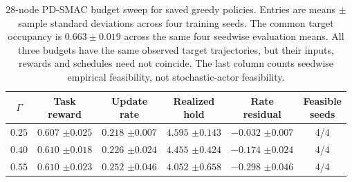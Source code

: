 \begin{table}[htbp]
\caption{28-node PD-SMAC budget sweep for saved greedy policies. Entries are means $\pm$ sample standard deviations across four training seeds. The common target occupancy is $0.663\pm0.019$ across the same four seedwise evaluation means. All three budgets have the same observed target trajectories, but their inputs, rewards and schedules need not coincide. The last column counts seedwise empirical feasibility, not stochastic-actor feasibility.}
\label{comp:tab:melanoma28_budget_sweep}
\centering
\begingroup
\fontsize{8}{10}\selectfont
\setlength{\tabcolsep}{2pt}
\renewcommand{\arraystretch}{1.14}
\begin{tabular*}{\linewidth}{@{\extracolsep{\fill}}cccccc@{}}
\toprule
$\Gamma$ & \shortstack{Task\\reward} & \shortstack{Update\\rate} & \shortstack{Realized\\hold} & \shortstack{Rate\\residual} & \shortstack{Feasible\\seeds} \\
\midrule
$0.25$ & \shortstack{$0.607$\\$\pm0.025$} & \shortstack{$0.218$\\$\pm0.007$} & \shortstack{$4.595$\\$\pm0.143$} & \shortstack{$-0.032$\\$\pm0.007$} & 4/4 \\[2pt]
$0.40$ & \shortstack{$0.610$\\$\pm0.018$} & \shortstack{$0.226$\\$\pm0.024$} & \shortstack{$4.455$\\$\pm0.424$} & \shortstack{$-0.174$\\$\pm0.024$} & 4/4 \\[2pt]
$0.55$ & \shortstack{$0.610$\\$\pm0.023$} & \shortstack{$0.252$\\$\pm0.046$} & \shortstack{$4.052$\\$\pm0.658$} & \shortstack{$-0.298$\\$\pm0.046$} & 4/4 \\[2pt]
\bottomrule
\end{tabular*}
\endgroup
\end{table}
